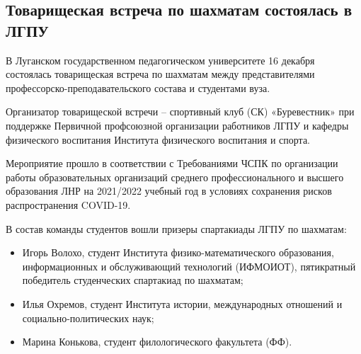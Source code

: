  
 
 
 
 
\subsection{Товарищеская встреча по шахматам состоялась в ЛГПУ}
\label{sec:17_12_2021.stz.edu.lnr.lgpu.1.chess}


В Луганском государственном педагогическом университете 16 декабря состоялась
товарищеская встреча по шахматам между представителями
профессорско-преподавательского состава и студентами вуза. 


Организатор товарищеской встречи – спортивный клуб (СК) «Буревестник» при
поддержке Первичной профсоюзной организации работников ЛГПУ и кафедры
физического воспитания Института физического воспитания и спорта.

Мероприятие прошло в соответствии с Требованиями ЧСПК по организации работы
образовательных организаций среднего профессионального и высшего образования
ЛНР на 2021/2022 учебный год в условиях сохранения рисков распространения
COVID-19.


В состав команды студентов вошли призеры спартакиады ЛГПУ по шахматам:

\begin{itemize} %
\item Игорь Волохо, студент Института физико-математического образования, информационных и обслуживающий технологий (ИФМОИОТ), пятикратный победитель студенческих спартакиад по шахматам;
\item Илья Охремов, студент Института истории, международных отношений и социально-политических наук;
\item Марина Конькова, студент филологического факультета (ФФ).
\end{itemize} %

